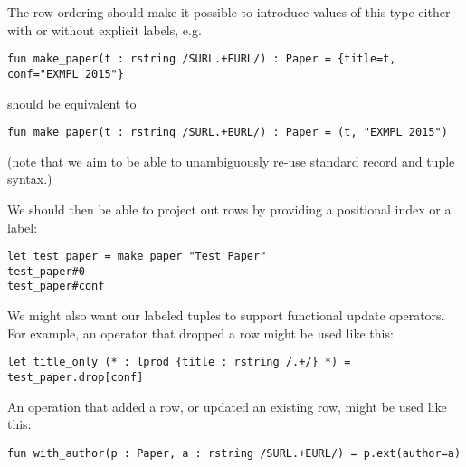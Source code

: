 The row ordering should make it possible to introduce values of this type either with or without explicit labels, e.g.
\begin{lstlisting}[numbers=none]
fun make_paper(t : rstring /SURL.+EURL/) : Paper = {title=t, conf="EXMPL 2015"}
\end{lstlisting}
should be equivalent to
\begin{lstlisting}[numbers=none]
fun make_paper(t : rstring /SURL.+EURL/) : Paper = (t, "EXMPL 2015")
\end{lstlisting}
(note that we aim to be able to unambiguously re-use standard record and tuple syntax.)

We should then be able to project out rows by providing a positional index or a label:
\begin{lstlisting}[numbers=none]
let test_paper = make_paper "Test Paper"
test_paper#0
test_paper#conf
\end{lstlisting}

We might also want our labeled tuples to support functional update operators. For example, an operator that dropped a row might be used like this:
\begin{lstlisting}[numbers=none]
let title_only (* : lprod {title : rstring /.+/} *) = test_paper.drop[conf]
\end{lstlisting}
An operation that added a row, or updated an existing row, might be used like this:
\begin{lstlisting}[numbers=none]
fun with_author(p : Paper, a : rstring /SURL.+EURL/) = p.ext(author=a)
\end{lstlisting}



